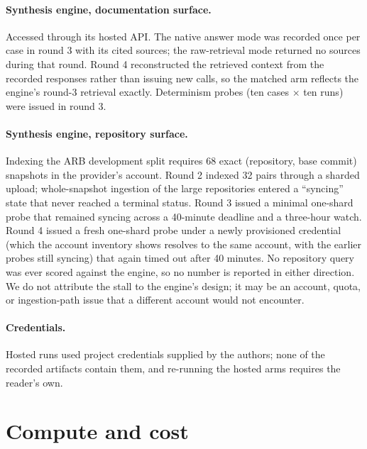 \documentclass{article}
\begin{document}
\paragraph{Synthesis engine, documentation surface.} Accessed through its hosted API. The native answer mode was recorded once per case in round 3 with its cited sources; the raw-retrieval mode returned no sources during that round. Round 4 reconstructed the retrieved context from the recorded responses rather than issuing new calls, so the matched arm reflects the engine's round-3 retrieval exactly. Determinism probes (ten cases $\times$ ten runs) were issued in round 3.

\paragraph{Synthesis engine, repository surface.} Indexing the ARB development split requires 68 exact (repository, base commit) snapshots in the provider's account. Round 2 indexed 32 pairs through a sharded upload; whole-snapshot ingestion of the large repositories entered a ``syncing'' state that never reached a terminal status. Round 3 issued a minimal one-shard probe that remained syncing across a 40-minute deadline and a three-hour watch. Round 4 issued a fresh one-shard probe under a newly provisioned credential (which the account inventory shows resolves to the same account, with the earlier probes still syncing) that again timed out after 40 minutes. No repository query was ever scored against the engine, so no number is reported in either direction. We do not attribute the stall to the engine's design; it may be an account, quota, or ingestion-path issue that a different account would not encounter.

\paragraph{Credentials.} Hosted runs used project credentials supplied by the authors; none of the recorded artifacts contain them, and re-running the hosted arms requires the reader's own.

\section{Compute and cost}
\label{app:compute}
\end{document}
